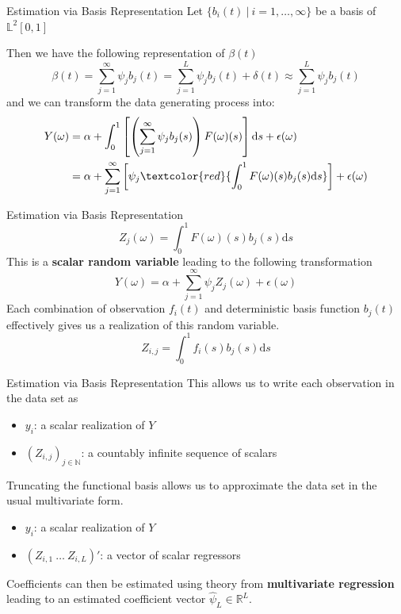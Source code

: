 \documentclass{beamer}
\begin{document}
	\begin{frame}{Estimation via Basis Representation}
		Let $\{b_i(t) \: \vert \: i = 1, \dots, \infty\}$ be a basis of $\mathbb{L}^2[0,1]$
		\vspace{0.2cm}
		
		Then we have the following representation of $\beta(t)$
		$$\beta(t) = \sum_{j = 1}^{\infty} \psi_j b_j(t) = \sum_{j = 1}^{L} \psi_j b_j(t) + \delta(t) \approx \sum_{j = 1}^{L} \psi_j b_j(t)$$
		and we can transform the data generating process into:
		\begin{equation}\notag
			\begin{split}
				Y(\omega) & = \alpha + \int_{0}^{1}\left[\left(\sum_{j = 1}^{\infty} \psi_j  b_j(s)\right) F(\omega)(s) \right]\mathrm{d}s + \epsilon(\omega) \\
						  & = \alpha + \sum_{j = 1}^{\infty} \left[\psi_j \textcolor{red}{\int_{0}^{1} F(\omega)(s) b_j(s)\mathrm{d}s}\right] + \epsilon(\omega)	  
			\end{split}
		\end{equation}
	\end{frame}

	\begin{frame}{Estimation via Basis Representation}
		$$Z_j(\omega) = \int_{0}^{1} F(\omega)(s) b_j(s)\mathrm{d}s$$ 
		This is a \textbf{scalar random variable} leading to the following transformation
		$$Y(\omega) = \alpha + \sum_{j = 1}^{\infty} \psi_j Z_j(\omega) + \epsilon(\omega)$$
		Each combination of observation $f_i(t)$ and deterministic basis function $b_j(t)$ effectively gives us a realization of this random variable.
		$$Z_{i,j} = \int_{0}^{1} f_i(s) b_j(s)\mathrm{d}s$$
		
	\end{frame}

	\begin{frame}{Estimation via Basis Representation}
		This allows us to write each observation in the data set as
		\begin{itemize}
			\item $y_i$: a scalar realization of $Y$
			\item $\left(Z_{i,j}\right)_{j \in \mathbb{N}}$: a countably infinite sequence of scalars
		\end{itemize}
		\vspace{0.2cm}
		
		Truncating the functional basis allows us to approximate the data set in the usual multivariate form.
		\begin{itemize}
			\item $y_i$: a scalar realization of $Y$
			\item $\left(Z_{i,1} \: \dots \:  Z_{i,L} \right)'$: a vector of scalar regressors
		\end{itemize}
		\vspace{0.2cm}
		
		Coefficients can then be estimated using theory from \textbf{multivariate regression} leading to an estimated coefficient vector $\hat{\psi}_L \in \mathbb{R}^L$.
	\end{frame}
\end{document}
